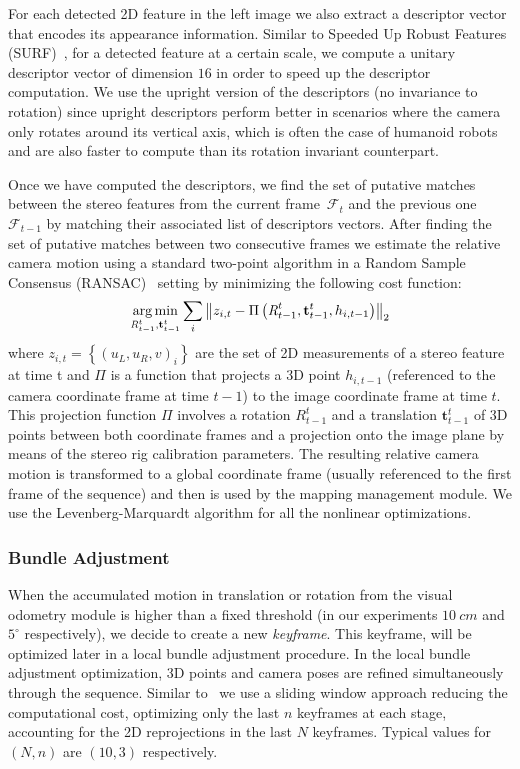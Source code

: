 For each detected 2D feature in the left image we also extract a descriptor vector that encodes its appearance information. Similar to Speeded Up Robust Features (SURF)~\cite{Bay08cviu}, for a detected
feature at a certain scale, we compute a unitary descriptor vector of dimension $16$ in order to speed up the descriptor computation. We use the upright version of the descriptors (no invariance to rotation)
since upright descriptors perform better in scenarios where the camera only rotates around its vertical axis, which is often the case of humanoid robots and are also faster to compute than its rotation invariant counterpart.

Once we have computed the descriptors, we find the set of putative matches between the stereo features from the current frame~$\mathcal{F}_{t}$ and the previous one~$\mathcal{F}_{t-1}$ by matching their associated list of descriptors vectors. After finding the set of putative matches between two consecutive frames we estimate the relative camera motion using a standard two-point algorithm in a Random Sample Consensus (RANSAC)~\cite{Bolles81ijcai} setting by minimizing the following cost function:
%
\begin{equation} \label{eq:three_pt}
\argmin_{\textit{R}_{t-1}^{t},\mathbf{t}_{t-1}^{t}} \sum\limits_{i} \left\| z_{i,t} - \Pi\left(\textit{R}_{t-1}^{t},\mathbf{t}_{t-1}^{t},h_{i,t-1}\right)\right\|_{2}
\end{equation}
%
where $z_{i,t}=\left\{\left(u_{L},u_{R},v\right)_{i}\right\}$ are the set of 2D measurements of a stereo feature at time t and $\Pi$ is a function that projects a 3D point $h_{i,t-1}$ (referenced to the camera coordinate frame at time $t-1$) to the image coordinate frame at time $t$. This projection function $\Pi$ involves a rotation $\textit{R}_{t-1}^{t}$ and a translation $\mathbf{t}_{t-1}^{t}$ of 3D
points between both coordinate frames and a projection onto the image plane by means of the stereo rig calibration parameters. The resulting relative camera motion is transformed to a global coordinate frame
(usually referenced to the first frame of the sequence) and then is used by the mapping management module. We use the Levenberg-Marquardt algorithm for all the nonlinear optimizations.

\subsubsection{Bundle Adjustment}\label{sec:ba}
When the accumulated motion in translation or rotation from the visual odometry module is higher than a fixed threshold (in our experiments $10~cm$ and $5^{\circ}$ respectively), we decide to create a new \textit{keyframe}. This keyframe, will be optimized later in a local bundle adjustment procedure. In the local bundle adjustment optimization, 3D points and camera poses are refined simultaneously through the sequence. Similar to~\cite{Mouragnon09ivc} we use a sliding window approach reducing the computational cost, optimizing only the last $n$ keyframes at each stage, accounting for the 2D reprojections in the last $N$ keyframes. Typical values for $\left(N,n\right)$ are $\left(10,3\right)$ respectively.

